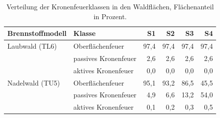 \begin{table}[htbp]
  \centering
  \caption{Verteilung der Kronenfeuerklassen in den Waldflächen, Flächenanteil in Prozent.}
  \label{tab:kronenfeuer}
  \begin{tabular}{llrrrr}
    \toprule
    Brennstoffmodell & Klasse & S1 & S2 & S3 & S4 \\
    \midrule
    Laubwald (TL6) & Oberflächenfeuer & 97{,}4 & 97{,}4 & 97{,}4 & 97{,}4 \\
     & passives Kronenfeuer & 2{,}6 & 2{,}6 & 2{,}6 & 2{,}6 \\
     & aktives Kronenfeuer & 0{,}0 & 0{,}0 & 0{,}0 & 0{,}0 \\
    Nadelwald (TU5) & Oberflächenfeuer & 95{,}1 & 93{,}2 & 86{,}5 & 45{,}5 \\
     & passives Kronenfeuer & 4{,}9 & 6{,}6 & 13{,}2 & 54{,}0 \\
     & aktives Kronenfeuer & 0{,}1 & 0{,}2 & 0{,}3 & 0{,}5 \\
    \bottomrule
  \end{tabular}
\end{table}
